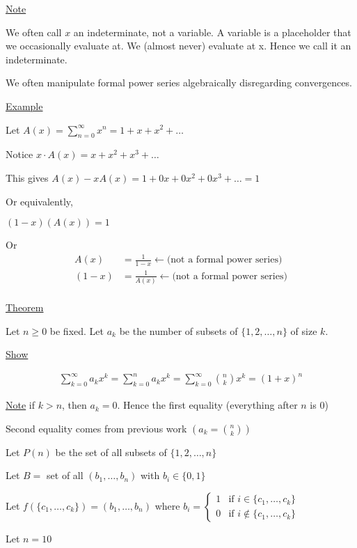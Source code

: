 \documentclass{article}
\begin{document}
\underline{Note}

We often call $x$ an indeterminate, not a variable. A variable is a placeholder that we occasionally evaluate at. We (almost never) evaluate at x. Hence we call it an indeterminate. 

We often manipulate formal power series algebraically disregarding convergences. 

\underline{Example}

Let $A(x) = \sum_{n=0}^{\infty}x^n = 1 + x + x^2 + \ldots$

Notice $x \cdot A(x) = x + x^2 + x^3 + \ldots$

This gives $A(x) - xA(x) = 1 + 0x + 0x^2 + 0x^3 + \ldots = 1$

Or equivalently, 

$(1-x)(A(x)) = 1$

Or 
\begin{align*}
A(x) &= \frac{1}{1-x} \leftarrow \text{(not a formal power series)} \\
(1-x) &= \frac{1}{A(x)} \leftarrow \text{(not a formal power series)} \\
\end{align*}

\underline{Theorem}

Let $n \ge 0$ be fixed. Let $a_k$ be the number of subsets of $\{1,2,\ldots,n\}$ of size $k$. 

\underline{Show}

\begin{align*}
    \sum_{k=0}^{\infty}a_kx^k = \sum_{k=0}^{n}a_kx^k = \sum_{k=0}^{\infty}\binom{n}{k}x^k = (1+x)^n
\end{align*}

\underline{Note} if $k > n$, then $a_k = 0$. Hence the first equality (everything after $n$ is 0)

Second equality comes from previous work $(a_k = \binom{n}{k})$

Let $P(n)$ be the set of all subsets of $\{1,2,\ldots,n\}$

Let $B = $ set of all $(b_1, \ldots, b_n)$ with $b_i \in \{0,1\}$

Let $f(\{c_1,\ldots,c_k\}) = (b_1,\ldots,b_n)$ where $b_i = \begin{cases} 
  1 & \text{if } i \in \{c_1, \ldots, c_k\} \\
  0 & \text{if } i \notin \{c_1, \ldots, c_k\}
\end{cases}$

Let $n=10$
\end{document}
